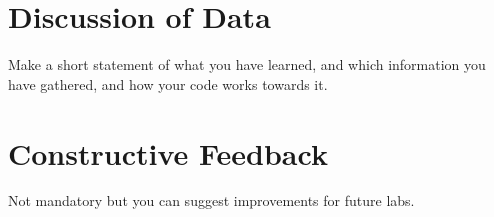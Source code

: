 \documentclass{article} %
\begin{document}

\section {Discussion of Data}
Make a short statement of what you have learned, and which information you have gathered, and how your code works towards it.

\section{Constructive Feedback}
Not mandatory but you can suggest improvements for future labs.



%
%


\end{document}
